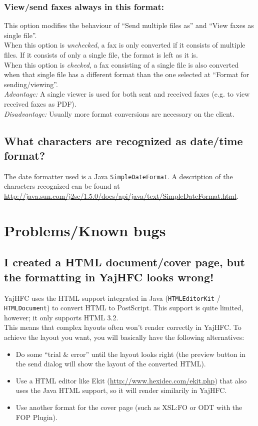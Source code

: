 \documentclass[a4paper,10pt]{scrartcl}
\begin{document}
\subsubsection{View/send faxes always in this format:}
This option modifies the behaviour of ``Send multiple files as'' and ``View faxes as single file''.\\
When this option is \textit{unchecked}, a fax is only converted if it consists of multiple files. If it consists of only a single file, the format is left as it is.\\
When this option is \textit{checked}, a fax consisting of a single file is also converted when that single file has a different format than the one selected at ``Format for sending/viewing''.\\
\textit{Advantage:} A single viewer is used for both sent and received faxes (e.g. to view received faxes as PDF).\\
\textit{Disadvantage:} Usually more format conversions are necessary on the client.

\subsection{What characters are recognized as date/time format?}

The date formatter used is a Java \texttt{SimpleDateFormat}. A description of the characters recognized can be found at \url{http://java.sun.com/j2se/1.5.0/docs/api/java/text/SimpleDateFormat.html}.

\section{Problems/Known bugs}

\subsection{I created a HTML document/cover page, but the formatting in YajHFC looks wrong!}

YajHFC uses the HTML support integrated in Java (\texttt{HTMLEditorKit} / \texttt{HTMLDocument}) to convert HTML to PostScript. This support is quite limited, however; it only supports HTML 3.2.\\
This means that complex layouts often won't render correctly in YajHFC.
To achieve the layout you want, you will basically have the following alternatives:

\begin{itemize}
 \item Do some ``trial \& error'' until the layout looks right (the preview button in the send dialog will show the layout of the converted HTML).
 \item Use a HTML editor like Ekit (\url{http://www.hexidec.com/ekit.php}) that also uses the Java HTML support, so it will render similarily in YajHFC.
 \item Use another format for the cover page (such as XSL:FO or ODT with the FOP Plugin).
\end{itemize}
\end{document}
